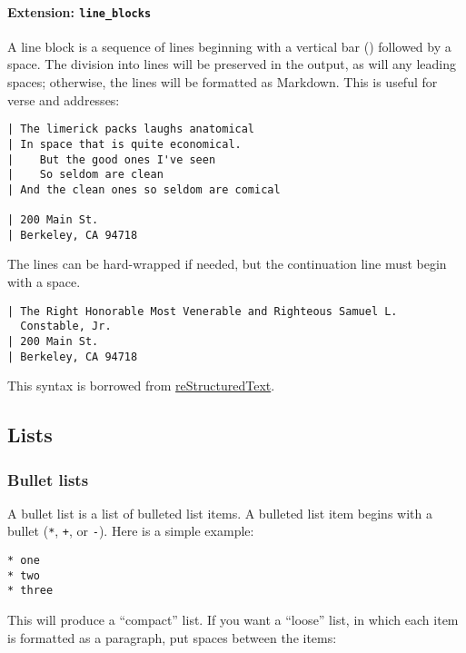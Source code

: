 \documentclass[]{article}
\let\oldparagraph\paragraph
\renewcommand{\paragraph}[1]{\oldparagraph{#1}\mbox{}}
\begin{document}
\paragraph{\texorpdfstring{Extension:
\texttt{line\_blocks}}{Extension: line\_blocks}}\label{extension-line_blocks}

A line block is a sequence of lines beginning with a vertical bar
(\texttt{\textbar{}}) followed by a space. The division into lines will
be preserved in the output, as will any leading spaces; otherwise, the
lines will be formatted as Markdown. This is useful for verse and
addresses:

\begin{verbatim}
| The limerick packs laughs anatomical
| In space that is quite economical.
|    But the good ones I've seen
|    So seldom are clean
| And the clean ones so seldom are comical

| 200 Main St.
| Berkeley, CA 94718
\end{verbatim}

The lines can be hard-wrapped if needed, but the continuation line must
begin with a space.

\begin{verbatim}
| The Right Honorable Most Venerable and Righteous Samuel L.
  Constable, Jr.
| 200 Main St.
| Berkeley, CA 94718
\end{verbatim}

This syntax is borrowed from
\href{http://docutils.sourceforge.net/docs/ref/rst/introduction.html}{reStructuredText}.

\subsection{Lists}\label{lists}

\subsubsection{Bullet lists}\label{bullet-lists}

A bullet list is a list of bulleted list items. A bulleted list item
begins with a bullet (\texttt{*}, \texttt{+}, or \texttt{-}). Here is a
simple example:

\begin{verbatim}
* one
* two
* three
\end{verbatim}

This will produce a ``compact'' list. If you want a ``loose'' list, in
which each item is formatted as a paragraph, put spaces between the
items:
\end{document}

